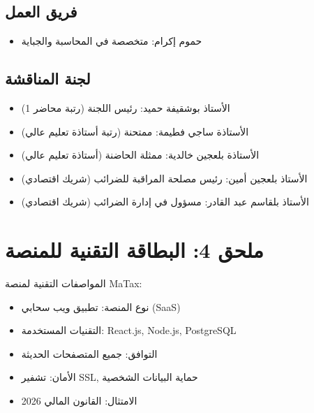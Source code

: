 \documentclass[12pt, a4paper, twoside]{report}
\begin{document}
\subsection*{فريق العمل}
\begin{itemize}
    \item حموم إكرام: متخصصة في المحاسبة والجباية
\end{itemize}

\subsection*{لجنة المناقشة}
\begin{itemize}
    \item الأستاذ بوشقيفة حميد: رئيس اللجنة (رتبة محاضر 1)
    \item الأستاذة ساجي فطيمة: ممتحنة (رتبة أستاذة تعليم عالي)
    \item الأستاذة بلعجين خالدية: ممثلة الحاضنة (أستاذة تعليم عالي)
    \item الأستاذ بلعجين أمين: رئيس مصلحة المراقبة للضرائب (شريك اقتصادي)
    \item الأستاذ بلقاسم عبد القادر: مسؤول في إدارة الضرائب (شريك اقتصادي)
\end{itemize}

\section*{ملحق 4: البطاقة التقنية للمنصة}

المواصفات التقنية لمنصة MaTax:
\begin{itemize}
    \item نوع المنصة: تطبيق ويب سحابي (SaaS)
    \item التقنيات المستخدمة: React.js, Node.js, PostgreSQL
    \item التوافق: جميع المتصفحات الحديثة
    \item الأمان: تشفير SSL, حماية البيانات الشخصية
    \item الامتثال: القانون المالي 2026
\end{itemize}
\end{document}
